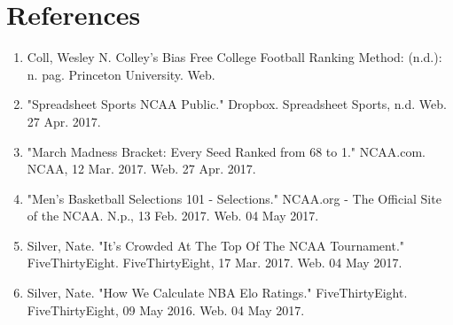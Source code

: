 \documentclass[12pt]{article}
\begin{document}
\section{References}
\begin{enumerate}
\item Coll, Wesley N. Colley’s Bias Free College Football Ranking Method: (n.d.): n. pag. Princeton University. Web.
\item "Spreadsheet Sports NCAA Public." Dropbox. Spreadsheet Sports, n.d. Web. 27 Apr. 2017.
\item "March Madness Bracket: Every Seed Ranked from 68 to 1." NCAA.com. NCAA, 12 Mar. 2017. Web. 27 Apr. 2017.
\item "Men's Basketball Selections 101 - Selections." NCAA.org - The Official Site of the NCAA. N.p., 13 Feb. 2017. Web. 04 May 2017.
\item Silver, Nate. "It's Crowded At The Top Of The NCAA Tournament." FiveThirtyEight. FiveThirtyEight, 17 Mar. 2017. Web. 04 May 2017.
\item Silver, Nate. "How We Calculate NBA Elo Ratings." FiveThirtyEight. FiveThirtyEight, 09 May 2016. Web. 04 May 2017.
\end{enumerate}
\newpage
\end{document}
